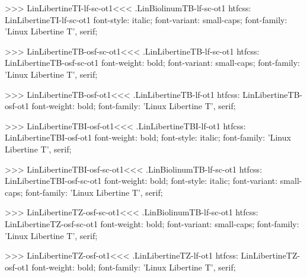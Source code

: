 {{{{{{{>>>
\<LinLibertineTI-lf-sc-ot1\><<<
.LinBiolinumTB-lf-sc-ot1
htfcss:  LinLibertineTI-lf-sc-ot1  font-style: italic; font-variant: small-caps; font-family: 'Linux Libertine T', serif;

>>>
\<LinLibertineTB-osf-sc-ot1\><<<
.LinLibertineTB-lf-sc-ot1
htfcss:  LinLibertineTB-osf-sc-ot1  font-weight: bold; font-variant: small-caps; font-family: 'Linux Libertine T', serif;

>>>
\<LinLibertineTB-osf-ot1\><<<
.LinLibertineTB-lf-ot1
htfcss:  LinLibertineTB-osf-ot1  font-weight: bold; font-family: 'Linux Libertine T', serif;

>>>
\<LinLibertineTBI-osf-ot1\><<<
.LinLibertineTBI-lf-ot1
htfcss:  LinLibertineTBI-osf-ot1  font-weight: bold; font-style: italic; font-family: 'Linux Libertine T', serif;

>>>
\<LinLibertineTBI-osf-sc-ot1\><<<
.LinBiolinumTB-lf-sc-ot1
htfcss:  LinLibertineTBI-osf-sc-ot1  font-weight: bold; font-style: italic; font-variant: small-caps; font-family: 'Linux Libertine T', serif;

>>>
\<LinLibertineTZ-osf-sc-ot1\><<<
.LinBiolinumTB-lf-sc-ot1
htfcss:  LinLibertineTZ-osf-sc-ot1  font-weight: bold; font-variant: small-caps; font-family: 'Linux Libertine T', serif;

>>>
\<LinLibertineTZ-osf-ot1\><<<
.LinLibertineTZ-lf-ot1
htfcss:  LinLibertineTZ-osf-ot1  font-weight: bold; font-family: 'Linux Libertine T', serif;

}}}}}}}
